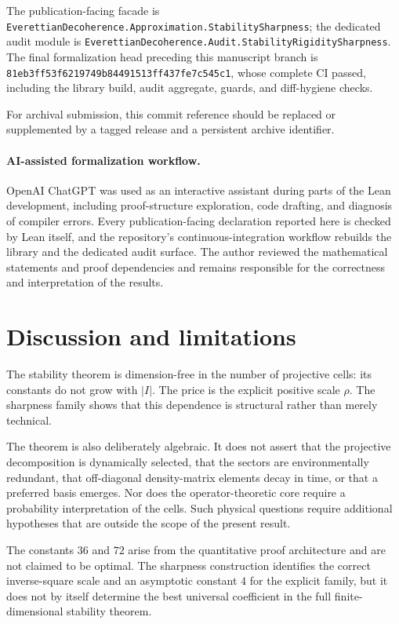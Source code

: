 \documentclass[11pt]{article}
\begin{document}
The publication-facing facade is
\texttt{EverettianDecoherence.Approximation.StabilitySharpness}; the dedicated
audit module is
\texttt{EverettianDecoherence.Audit.StabilityRigiditySharpness}.
The final formalization head preceding this manuscript branch is
\texttt{81eb3ff53f6219749b84491513ff437fe7c545c1}, whose complete CI passed,
including the library build, audit aggregate, guards, and diff-hygiene checks.

For archival submission, this commit reference should be replaced or
supplemented by a tagged release and a persistent archive identifier.

\paragraph{AI-assisted formalization workflow.}
OpenAI ChatGPT was used as an interactive assistant during parts of the Lean
development, including proof-structure exploration, code drafting, and
diagnosis of compiler errors. Every publication-facing declaration reported
here is checked by Lean itself, and the repository's continuous-integration
workflow rebuilds the library and the dedicated audit surface. The author
reviewed the mathematical statements and proof dependencies and remains
responsible for the correctness and interpretation of the results.

\section{Discussion and limitations}

The stability theorem is dimension-free in the number of projective cells:
its constants do not grow with $|I|$.  The price is the explicit positive
scale $\rho$.  The sharpness family shows that this dependence is structural
rather than merely technical.

The theorem is also deliberately algebraic.  It does not assert that the
projective decomposition is dynamically selected, that the sectors are
environmentally redundant, that off-diagonal density-matrix elements decay
in time, or that a preferred basis emerges.  Nor does the operator-theoretic
core require a probability interpretation of the cells.  Such physical
questions require additional hypotheses that are outside the scope of the
present result.

The constants $36$ and $72$ arise from the quantitative proof architecture
and are not claimed to be optimal.  The sharpness construction identifies the
correct inverse-square scale and an asymptotic constant $4$ for the explicit
family, but it does not by itself determine the best universal coefficient in
the full finite-dimensional stability theorem.
\end{document}
